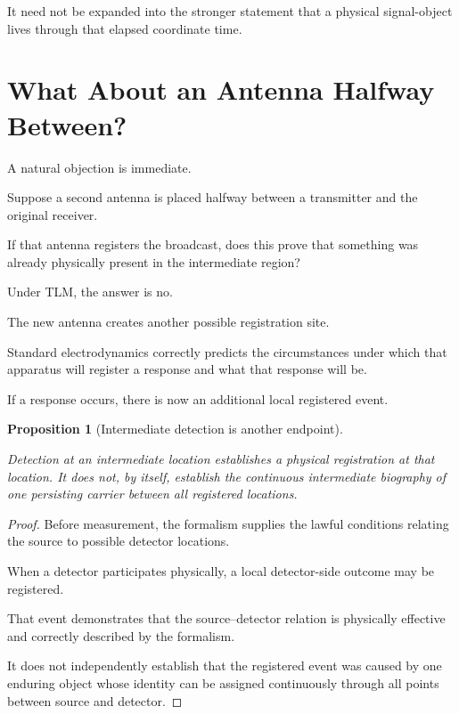 \documentclass[12pt,onecolumn]{article}
\newtheorem{proposition}{Proposition}[section]
\begin{document}
It need not be expanded into the stronger statement that a physical
signal-object lives through that elapsed coordinate time.

\section{What About an Antenna Halfway Between?}

A natural objection is immediate.

Suppose a second antenna is placed halfway between a transmitter and the
original receiver.

If that antenna registers the broadcast, does this prove that something
was already physically present in the intermediate region?

Under TLM, the answer is no.

The new antenna creates another possible registration site.

Standard electrodynamics correctly predicts the circumstances under which
that apparatus will register a response and what that response will be.

If a response occurs, there is now an additional local registered event.

\begin{proposition}[Intermediate detection is another endpoint]
\label{prop:intermediate}

Detection at an intermediate location establishes a physical
registration at that location. It does not, by itself, establish the
continuous intermediate biography of one persisting carrier between all
registered locations.

\end{proposition}

\begin{proof}

Before measurement, the formalism supplies the lawful conditions relating
the source to possible detector locations.

When a detector participates physically, a local detector-side outcome
may be registered.

That event demonstrates that the source--detector relation is physically
effective and correctly described by the formalism.

It does not independently establish that the registered event was caused
by one enduring object whose identity can be assigned continuously
through all points between source and detector.

\end{proof}
\end{document}
